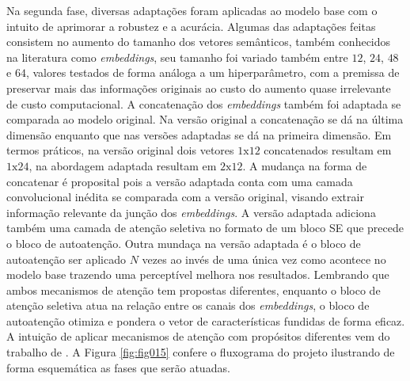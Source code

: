 Na segunda fase, diversas adaptações foram aplicadas ao modelo base com o intuito de aprimorar a robustez e a acurácia. Algumas das adaptações feitas consistem no aumento do tamanho dos vetores semânticos, também conhecidos na literatura como \textit{embeddings}, seu tamanho foi variado também entre $12$, $24$, $48$ e $64$, valores testados de forma análoga a um hiperparâmetro, com a premissa de preservar mais das informações originais ao custo do aumento quase irrelevante de custo computacional. A concatenação dos \textit{embeddings} também foi adaptada se comparada ao modelo original. Na versão original a concatenação se dá na última dimensão enquanto que nas versões adaptadas se dá na primeira dimensão. Em termos práticos, na versão original dois vetores $1\text{x}12$ concatenados resultam em $1\text{x}24$, na abordagem adaptada resultam em $2\text{x}12$. A mudança na forma de concatenar é proposital pois a versão adaptada conta com uma camada convolucional inédita se comparada com a versão original, visando extrair informação relevante da junção dos \textit{embeddings}. A versão adaptada adiciona também uma camada de atenção seletiva no formato de um bloco \gls{SE} que precede o bloco de autoatenção. Outra mundaça na versão adaptada é o bloco de autoatenção ser aplicado $N$ vezes ao invés de uma única vez como acontece no modelo base trazendo uma perceptível melhora nos resultados. Lembrando que ambos mecanismos de atenção tem propostas diferentes, enquanto o bloco de atenção seletiva atua na relação entre os canais dos \textit{embeddings}, o bloco de autoatenção otimiza e pondera o vetor de características fundidas de forma eficaz. A intuição de aplicar mecanismos de atenção com propósitos diferentes vem do trabalho de \cite{yangNeuralNetworkDesign2024a}. A Figura \ref{fig:fig015} confere o fluxograma do projeto ilustrando de forma esquemática as fases que serão atuadas.

